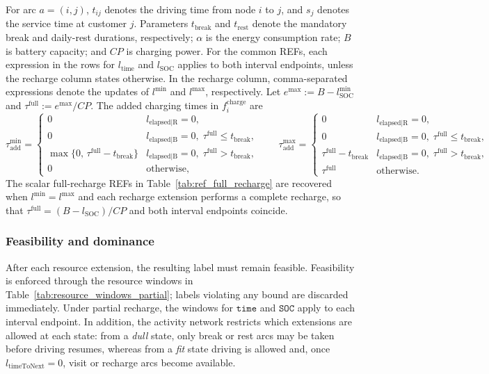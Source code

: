 \documentclass[3p,11pt,authoryear]{elsarticle}  %
\begin{document}
For arc $a=(i,j)$, $t_{ij}$ denotes the driving time from node $i$ to $j$, and $s_j$ denotes the service time at customer $j$. Parameters $t_{\text{break}}$ and $t_{\text{rest}}$ denote the mandatory break and daily-rest durations, respectively; $\alpha$ is the energy consumption rate; $B$ is battery capacity; and $CP$ is charging power. For the common REFs, each expression in the rows for $l_{\text{time}}$ and $l_{\text{SOC}}$ applies to both interval endpoints, unless the recharge column states otherwise. In the recharge column, comma-separated expressions denote the updates of $l^{\min}$ and $l^{\max}$, respectively. Let $e^{\max}:=B-l^{\min}_{\text{SOC}}$ and $\tau^{\mathrm{full}}:=e^{\max}/CP$. The added charging times in $f^{\text{charge}}_{i}$ are
\[
\tau^{\min}_{\mathrm{add}}=
\begin{cases}
0 & l_{\text{elapsed|R}} = 0,\\[2pt]
0 & l_{\text{elapsed|B}} = 0,\;
  \tau^{\mathrm{full}} \le t_{\text{break}},\\[2pt]
\max\!\bigl\{0,\, \tau^{\mathrm{full}} - t_{\text{break}}\bigr\}
  & l_{\text{elapsed|B}} = 0,\;
  \tau^{\mathrm{full}} > t_{\text{break}},\\[2pt]
0 & \text{otherwise},
\end{cases}
\qquad
\tau^{\max}_{\mathrm{add}}=
\begin{cases}
0 & l_{\text{elapsed|R}} = 0,\\[2pt]
0 & l_{\text{elapsed|B}} = 0,\;
  \tau^{\mathrm{full}} \le t_{\text{break}},\\[2pt]
\tau^{\mathrm{full}} - t_{\text{break}}
  & l_{\text{elapsed|B}} = 0,\;
  \tau^{\mathrm{full}} > t_{\text{break}},\\[2pt]
\tau^{\mathrm{full}} & \text{otherwise}.
\end{cases}
\]
The scalar full-recharge REFs in Table~\ref{tab:ref_full_recharge} are recovered when $l^{\min}=l^{\max}$ and each recharge extension performs a complete recharge, so that $\tau^{\mathrm{full}}=(B-l_{\text{SOC}})/CP$ and both interval endpoints coincide.


\subsubsection{Feasibility and dominance}

After each resource extension, the resulting label must remain feasible. Feasibility is enforced through the resource windows in Table~\ref{tab:resource_windows_partial}; labels violating any bound are discarded immediately. Under partial recharge, the windows for $\texttt{time}$ and $\texttt{SOC}$ apply to each interval endpoint. In addition, the activity network restricts which extensions are allowed at each state: from a \emph{dull} state, only break or rest arcs may be taken before driving resumes, whereas from a \emph{fit} state driving is allowed and, once $l_{\text{timeToNext}}=0$, visit or recharge arcs become available.
\end{document}
